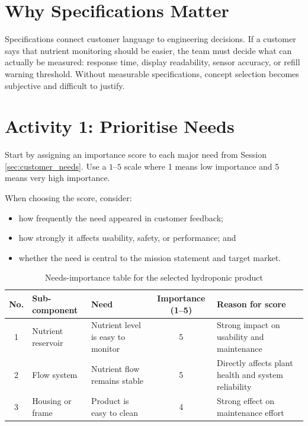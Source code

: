 \section{Why Specifications Matter}

Specifications connect customer language to engineering decisions. If a customer says that nutrient monitoring should be easier, the team must decide what can actually be measured: response time, display readability, sensor accuracy, or refill warning threshold. Without measurable specifications, concept selection becomes subjective and difficult to justify.

\section{Activity 1: Prioritise Needs}

Start by assigning an importance score to each major need from Session \ref{sec:customer_needs}. Use a $1$--$5$ scale where 1 means low importance and 5 means very high importance.

When choosing the score, consider:
\begin{itemize}
    \item how frequently the need appeared in customer feedback;
    \item how strongly it affects usability, safety, or performance; and
    \item whether the need is central to the mission statement and target market.
\end{itemize}

\begin{table}[htbp]
\centering
\caption{Needs-importance table for the selected hydroponic product}
\label{tab:session8-needs-importance}
\renewcommand{\arraystretch}{1.2}
\begin{tabularx}{\textwidth}{|c|>{\raggedright\arraybackslash}p{}|>{\raggedright\arraybackslash}X|c|>{\raggedright\arraybackslash}p{}|}
\hline
\textbf{No.} & \textbf{Sub-component} & \textbf{Need} & \textbf{Importance (1--5)} & \textbf{Reason for score} \\
\hline
1 & Nutrient reservoir & Nutrient level is easy to monitor & 5 & Strong impact on usability and maintenance \\
\hline
2 & Flow system & Nutrient flow remains stable & 5 & Directly affects plant health and system reliability \\
\hline
3 & Housing or frame & Product is easy to clean & 4 & Strong effect on maintenance effort \\
\hline
\end{tabularx}
\end{table}

